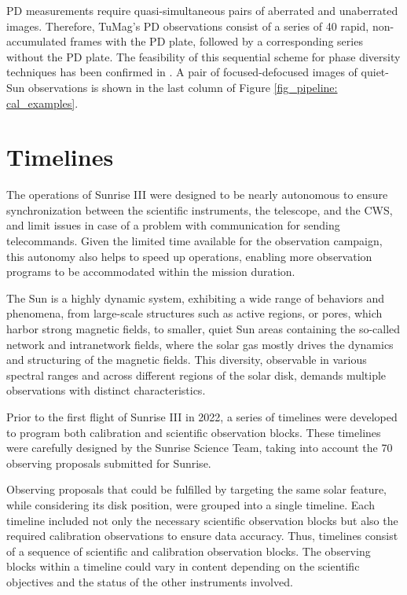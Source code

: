 PD measurements require quasi-simultaneous pairs of aberrated and unaberrated images. Therefore, TuMag's PD observations consist of a series of 40 rapid, non-accumulated frames with the PD plate, followed by a corresponding series without the PD plate. The feasibility of this sequential scheme for phase diversity techniques has been confirmed in \cite{PD_sequential}. A pair of focused-defocused images of quiet-Sun observations is shown in the last column of Figure \ref{fig_pipeline: cal_examples}.

\section{Timelines}

The operations of Sunrise III were designed to be nearly autonomous to ensure synchronization between the scientific instruments, the telescope, and the CWS, and limit issues in case of a problem with communication for sending telecommands. Given the limited time available for the observation campaign, this autonomy also helps to speed up operations, enabling more observation programs to be accommodated within the mission duration.

The Sun is a highly dynamic system, exhibiting a wide range of behaviors and phenomena, from large-scale structures such as active regions, or pores, which harbor strong magnetic fields, to smaller, quiet Sun areas containing the so-called network and intranetwork fields, where the solar gas mostly drives the dynamics and structuring of the magnetic fields. This diversity, observable in various spectral ranges and across different regions of the solar disk, demands multiple observations with distinct characteristics.

Prior to the first flight of Sunrise III in 2022, a series of timelines were developed to program both calibration and scientific observation blocks. These timelines were carefully designed by the Sunrise Science Team, taking into account the 70 observing proposals submitted for Sunrise.

Observing proposals that could be fulfilled by targeting the same solar feature, while considering its disk position, were grouped into a single timeline. Each timeline included not only the necessary scientific observation blocks but also the required calibration observations to ensure data accuracy. Thus, timelines consist of a sequence of scientific and calibration observation blocks. The observing blocks within a timeline could vary in content depending on the scientific objectives and the status of the other instruments involved.

